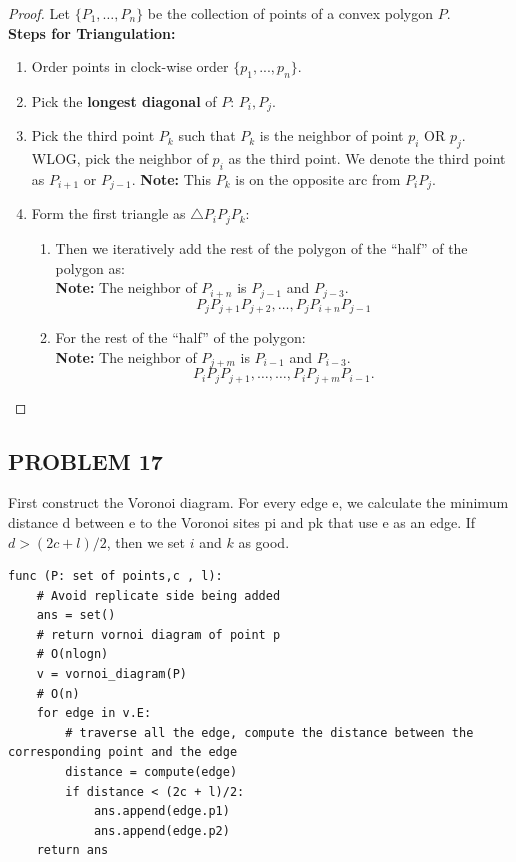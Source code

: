 \documentclass{article}
\begin{document}
\begin{proof}
    Let $\{P_1, \dots, P_n\}$ be the collection of points of a convex polygon $P$.
    \\
    \textbf{Steps for Triangulation: }

    \begin{enumerate}
        \item Order points in clock-wise order $\{p_1, ..., p_n\}$.
        
        \item Pick the \textbf{longest diagonal} of $P$: $P_i, P_j$.
    
        \item Pick the third point $P_k$ such that $P_k$ is the neighbor of point $p_i$ OR $p_j$. WLOG, 
        pick the neighbor of $p_i$ as the third point. We denote the third point as $P_{i+1}$ or $P_{j-1}$.
        \textbf{Note:} This $P_k$ is on the opposite arc from $P_i P_j$.
        \item Form the first triangle as $\triangle P_i P_j P_k$:
        \begin{enumerate}
            \item Then we iteratively add the rest of the polygon of the ``half'' of the polygon as:
            \\
            \textbf{Note:} The neighbor of $P_{i + n}$ is $P_{j - 1}$ and $P_{j - 3}$.
            \[
                P_j P_{j+1} P_{j+2}, \dots, P_{j} P_{i + n} P_{j-1}
            \]
        
            \item For the rest of the ``half'' of the polygon:
            \\
            \textbf{Note:} The neighbor of $P_{j + m}$ is $P_{i - 1}$ and $P_{i - 3}$.
            \[
                P_i P_j P_{j+1}, \dots, \dots, P_{i} P_{j + m} P_{i-1}.
            \]
        \end{enumerate}
\end{enumerate}

\end{proof}

\subsection*{PROBLEM 17}
First construct the Voronoi diagram. For every edge e, we calculate the minimum distance d between e to the Voronoi sites pi and pk that use e as an edge. If $d > (2c + l) / 2$, then we set $i$ and $k$ as good.
\\
\begin{verbatim}
func (P: set of points,c , l):
    # Avoid replicate side being added
    ans = set()
    # return vornoi diagram of point p
    # O(nlogn)
    v = vornoi_diagram(P)
    # O(n)
    for edge in v.E:
        # traverse all the edge, compute the distance between the corresponding point and the edge
        distance = compute(edge) 
        if distance < (2c + l)/2:
            ans.append(edge.p1)
            ans.append(edge.p2)
    return ans
\end{verbatim}
\end{document}
